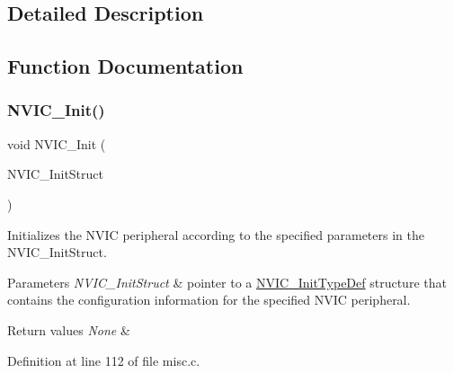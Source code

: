 \subsection{Detailed Description}


\subsection{Function Documentation}
\mbox{\label{group___m_i_s_c___exported___functions_ga4ab373ed0870c06fca5eb51d639adf41}} 
\subsubsection{\texorpdfstring{N\+V\+I\+C\+\_\+\+Init()}{NVIC\_Init()}}
{\footnotesize\ttfamily void N\+V\+I\+C\+\_\+\+Init (\begin{DoxyParamCaption}\item[{\hyperlink{struct_n_v_i_c___init_type_def}{N\+V\+I\+C\+\_\+\+Init\+Type\+Def} $\ast$}]{N\+V\+I\+C\+\_\+\+Init\+Struct }\end{DoxyParamCaption})}



Initializes the N\+V\+IC peripheral according to the specified parameters in the N\+V\+I\+C\+\_\+\+Init\+Struct. 


\begin{DoxyParams}{Parameters}
{\em N\+V\+I\+C\+\_\+\+Init\+Struct} & pointer to a \hyperlink{struct_n_v_i_c___init_type_def}{N\+V\+I\+C\+\_\+\+Init\+Type\+Def} structure that contains the configuration information for the specified N\+V\+IC peripheral. \\
\hline
\end{DoxyParams}

\begin{DoxyRetVals}{Return values}
{\em None} & \\
\hline
\end{DoxyRetVals}


Definition at line 112 of file misc.\+c.

\mbox{\label{group___m_i_s_c___exported___functions_gadfb1f34f803ce54c976643db8c484442}} 
